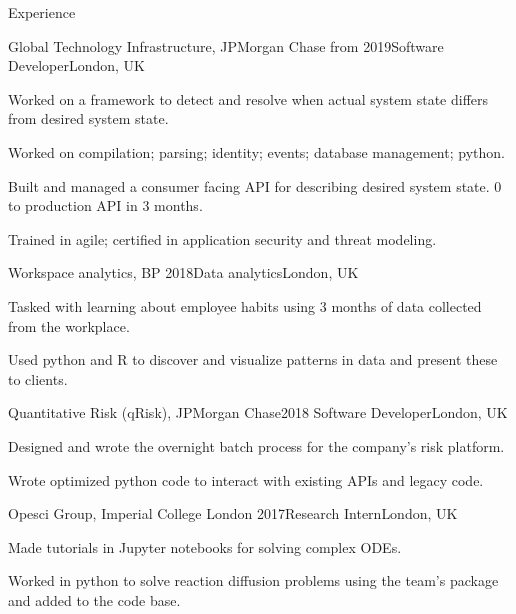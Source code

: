 \documentclass[10pt]{resume} %
\begin{document}
\begin{rSection}{Experience}


  \begin{rSubsection}{Global Technology Infrastructure, JPMorgan Chase}
    {from 2019}{Software Developer}{London, UK}
  \item Worked on a framework to detect and resolve when actual system state differs
    from desired system state.
  \item Worked on compilation; parsing; identity; events; database management; python.
  \item Built and managed a consumer facing API for describing desired system
    state. 0 to production API in 3 months.
  \item Trained in agile; certified in application security and threat modeling.
  \end{rSubsection}


  \begin{rSubsection}{Workspace analytics, BP}
    {2018}{Data analytics}{London, UK}
  \item Tasked with learning about employee habits using 3 months of data
    collected from the workplace.
  \item Used python and R to discover and visualize patterns in data and present
    these to clients.
  \end{rSubsection}


  \begin{rSubsection}{Quantitative Risk (qRisk), JPMorgan Chase}{2018}
    {Software Developer}{London, UK}
    \item Designed and wrote the overnight batch process for the company's risk
      platform.
    \item Wrote optimized python code to interact with existing APIs and legacy
      code.
  \end{rSubsection}


  \begin{rSubsection}{Opesci Group, Imperial College London}
    {2017}{Research Intern}{London, UK}
      \item Made tutorials in Jupyter notebooks for solving complex ODEs.
      \item Worked in python to solve reaction diffusion problems using the
      team's package and added to the code base.
  \end{rSubsection}


\end{rSection}
\end{document}
